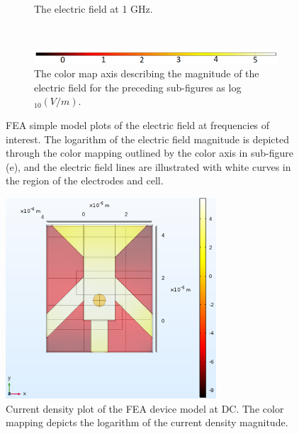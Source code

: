 \begin{figure}[h]
\begin{subfigure}[b]{\textwidth}
        \caption{The electric field at 1 GHz.}
    \end{subfigure}
        \\
    \vspace{0.1 in}
    \begin{subfigure}[b]{\textwidth}
        \centering
        \includegraphics[width=\textwidth]{images/simpleCellColorMapAxis.png}
        \caption{The color map axis describing the magnitude of the electric field for the preceding sub-figures as log$_{10}(V/m)$.}
    \end{subfigure}
    \caption[FEA simple model electric field surface plot.]{FEA simple model plots of the electric field at frequencies of interest. The logarithm of the electric field magnitude is depicted through the color mapping outlined by the color axis in sub-figure (e), and the electric field lines are illustrated with white curves in the region of the electrodes and cell.}
    \label{fig:single_cell_model_EZ_plots}
\end{figure}

\begin{figure}[h]
    \centering
    \includegraphics[width=0.7\textwidth]{images/deviceCellCurrent1Hz.png}
    \caption[Current density plot of the FEA device model.]{Current density plot of the FEA device model at DC. The color mapping depicts the logarithm of the current density magnitude.}
    \label{fig:device_current_denisty plot}
\end{figure}

